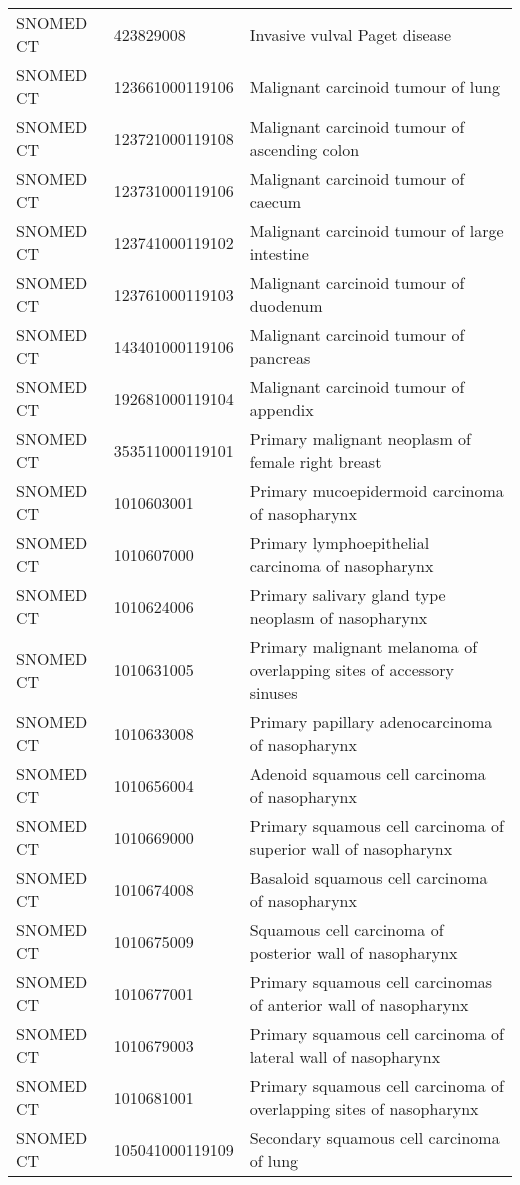 \begin{longtable}{p{}p{}p{}}
  SNOMED CT & 423829008 & Invasive vulval Paget disease \\ 
  SNOMED CT & 123661000119106 & Malignant carcinoid tumour of lung \\ 
  SNOMED CT & 123721000119108 & Malignant carcinoid tumour of ascending colon \\ 
  SNOMED CT & 123731000119106 & Malignant carcinoid tumour of caecum \\ 
  SNOMED CT & 123741000119102 & Malignant carcinoid tumour of large intestine \\ 
  SNOMED CT & 123761000119103 & Malignant carcinoid tumour of duodenum \\ 
  SNOMED CT & 143401000119106 & Malignant carcinoid tumour of pancreas \\ 
  SNOMED CT & 192681000119104 & Malignant carcinoid tumour of appendix \\ 
  SNOMED CT & 353511000119101 & Primary malignant neoplasm of female right breast \\ 
  SNOMED CT & 1010603001 & Primary mucoepidermoid carcinoma of nasopharynx \\ 
  SNOMED CT & 1010607000 & Primary lymphoepithelial carcinoma of nasopharynx \\ 
  SNOMED CT & 1010624006 & Primary salivary gland type neoplasm of nasopharynx \\ 
  SNOMED CT & 1010631005 & Primary malignant melanoma of overlapping sites of accessory sinuses \\ 
  SNOMED CT & 1010633008 & Primary papillary adenocarcinoma of nasopharynx \\ 
  SNOMED CT & 1010656004 & Adenoid squamous cell carcinoma of nasopharynx \\ 
  SNOMED CT & 1010669000 & Primary squamous cell carcinoma of superior wall of nasopharynx \\ 
  SNOMED CT & 1010674008 & Basaloid squamous cell carcinoma of nasopharynx \\ 
  SNOMED CT & 1010675009 & Squamous cell carcinoma of posterior wall of nasopharynx \\ 
  SNOMED CT & 1010677001 & Primary squamous cell carcinomas of anterior wall of nasopharynx \\ 
  SNOMED CT & 1010679003 & Primary squamous cell carcinoma of lateral wall of nasopharynx \\ 
  SNOMED CT & 1010681001 & Primary squamous cell carcinoma of overlapping sites of nasopharynx \\ 
  SNOMED CT & 105041000119109 & Secondary squamous cell carcinoma of lung \\ 

\end{longtable}

